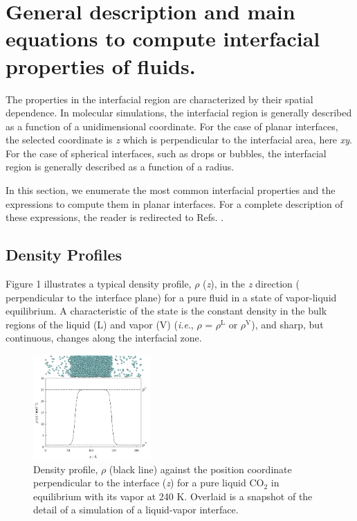 \documentclass[9pt,bestpractices]{livecoms}
\begin{document}
\section{General description and main equations to compute interfacial properties of fluids.}

The properties in the interfacial region are characterized by their spatial
dependence. In molecular simulations, the interfacial region is generally
described as a function of a unidimensional coordinate. For the case of planar
interfaces, the selected coordinate is \textit{z} which is perpendicular to the
interfacial area, here \textit{xy}. For the case of spherical interfaces, such
as drops or bubbles, the interfacial region is generally described as
a function of a radius.

In this section, we enumerate the most common interfacial properties and the
expressions to compute them in planar interfaces. For a complete description of
these expressions, the reader is redirected to Refs. \citep{allen2017,gray2011}.

\subsection{Density Profiles}

Figure 1 illustrates a typical density profile, ${\rho}$ (\textit{z}), in the
\textit{z} direction ( perpendicular to the interface plane) for a pure fluid
in a state of vapor-liquid equilibrium. A characteristic of the state is the
constant density in the bulk regions of the liquid (L) and vapor (V)
(\textit{i.e}., ${\rho}$ = ${\rho}$$^{\mathrm{L}}$ or ${\rho}$$^{\mathrm{V}}$),
and  sharp, but continuous, changes along the interfacial zone. 

\begin{figure}
	\centering
  \includegraphics[width=0.4\textwidth]{gfx/image1.png}
  \caption{Density profile, ${\rho}$ (black line) against the position coordinate perpendicular to the interface (\textit{z}) for a pure liquid CO$_{2}$ in equilibrium with its vapor at 240 K. Overlaid is a snapshot of the detail of a simulation of a liquid-vapor interface.}
  \label{fig:1}
\end{figure}
\end{document}
